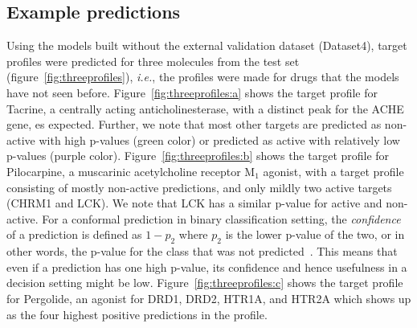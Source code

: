 \documentclass[10pt,article]{memoir}
\begin{document}
\subsection*{Example predictions}
Using the models built without the external validation dataset (Dataset4), target
profiles were predicted for three molecules from the test set
(figure~\ref{fig:threeprofiles}), \textit{i.e.}, the profiles were made for
drugs that the models have not seen before. Figure~\ref{fig:threeprofiles:a}
shows the target profile for Tacrine, a centrally acting anticholinesterase,
with a distinct peak for the ACHE gene, es expected. Further, we note that most
other targets are predicted as non-active with high p-values (green color) or
predicted as active with relatively low p-values (purple color).
Figure~\ref{fig:threeprofiles:b} shows the target profile for Pilocarpine, a
muscarinic acetylcholine receptor M$_1$ agonist, with a target profile
consisting of mostly non-active predictions, and only mildly two active targets
(CHRM1 and LCK). We note that LCK has a similar p-value for active and
non-active. For a conformal prediction in binary classification setting, the 
\textit{confidence} of a prediction is defined as $1 - p_2$ where $p_2$ is the
lower p-value of the two, or in other words, the p-value for the class that was
not predicted~\cite{Saunders1999}.  This means that even if a prediction has
one high p-value, its confidence and hence usefulness in a decision setting
might be low. Figure~\ref{fig:threeprofiles:c} shows the target profile for
Pergolide, an agonist for DRD1, DRD2, HTR1A, and HTR2A which shows up as the
four highest positive predictions in the profile.
\end{document}
